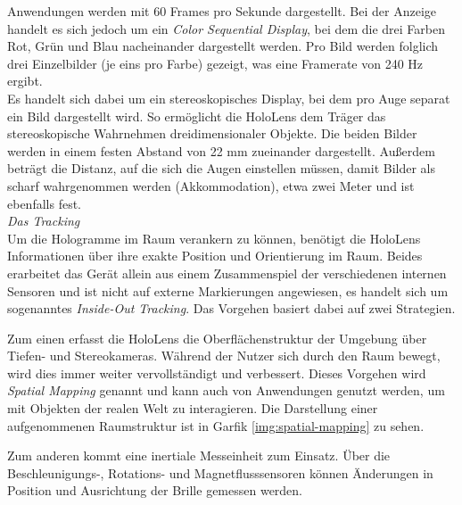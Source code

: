 Anwendungen werden mit 60 Frames pro Sekunde dargestellt. Bei der Anzeige handelt es sich jedoch um ein \textit{Color Sequential Display}, bei dem die drei Farben Rot, Grün und Blau nacheinander dargestellt werden. Pro Bild werden folglich drei Einzelbilder (je eins pro Farbe) gezeigt, was eine Framerate von 240 Hz ergibt.\\

Es handelt sich dabei um ein stereoskopisches Display, bei dem pro Auge separat ein Bild dargestellt wird. So ermöglicht die HoloLens dem Träger das stereoskopische Wahrnehmen dreidimensionaler Objekte. Die beiden Bilder werden in einem festen Abstand von 22 mm zueinander dargestellt. Außerdem beträgt die Distanz, auf die sich die Augen einstellen müssen, damit Bilder als scharf wahrgenommen werden (Akkommodation), etwa zwei Meter und ist ebenfalls fest.\\

\vspace{4px}
\textit{Das Tracking}\\
Um die Hologramme im Raum verankern zu können, benötigt die HoloLens Informationen über ihre exakte Position und Orientierung im Raum. Beides erarbeitet das Gerät allein aus einem Zusammenspiel der verschiedenen internen Sensoren und ist nicht auf externe Markierungen angewiesen, es handelt sich um sogenanntes \textit{Inside-Out Tracking}. Das Vorgehen basiert dabei auf zwei Strategien.
\par
\noindent\hspace*{5mm}
Zum einen erfasst die HoloLens die Oberflächenstruktur der Umgebung über Tiefen- und Stereokameras. Während der Nutzer sich durch den Raum bewegt, wird dies immer weiter vervollständigt und verbessert. Dieses Vorgehen wird \textit{Spatial Mapping} genannt und kann auch von Anwendungen genutzt werden, um mit Objekten der realen Welt zu interagieren. Die Darstellung einer aufgenommenen Raumstruktur ist in Garfik \ref{img:spatial-mapping} zu sehen.
\par
\noindent\hspace*{5mm}
Zum anderen kommt eine inertiale Messeinheit zum Einsatz. Über die Beschleunigungs-, Rotations- und Magnetflusssensoren können Änderungen in Position und Ausrichtung der Brille gemessen werden.

